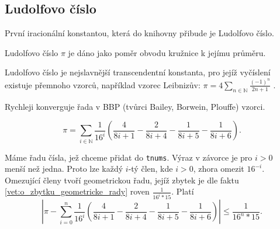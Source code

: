 \subsection{Ludolfovo číslo}
První iracionální konstantou, která do knihovny přibude je Ludolfovo číslo.

\begin{definition}
Ludolfovo číslo $\pi$ je dáno jako poměr obvodu kružnice k jejímu průměru.
\end{definition}

Ludolfovo číslo je nejslavnější transcendentní konstanta, pro jejíž vyčíslení existuje přemnoho vzorců, například vzorec Leibnizův: $\pi=4\sum_{n\in\mathbb{N}}\frac{(-1)^n}{2n+1}$ \cite{approxpi}.

Rychleji konverguje řada v BBP (tvůrci Bailey, Borwein, Plouffe) vzorci.

\begin{fact}
\begin{equation}\label{rov:pi-rada}
\pi=\sum_{i\in\mathbb{N}}\frac{1}{16^i}\left(\frac{4}{8i+1}-\frac{2}{8i+4}-\frac{1}{8i+5}-\frac{1}{8i+6}\right).
\end{equation}
\end{fact}

Máme řadu čísla, jež chceme přidat do \texttt{tnums}. Výraz v závorce je pro $i>0$\\ menší než jedna. Proto lze každý $i$-tý člen, kde $i>0$, zhora omezit $16^{-i}$. Omezující členy tvoří geometrickou řadu, jejíž zbytek je dle faktu \ref{vet:o_zbytku_geometricke_rady} roven $\frac{1}{16^i*15}$. Platí\\
\begin{equation}
\left|\pi - \sum_{i=0}^n\frac{1}{16^i}\left(\frac{4}{8i+1}-\frac{2}{8i+4}-\frac{1}{8i+5}-\frac{1}{8i+6}\right) \right| \leq \frac{1}{16^n*15}.
\end{equation}

